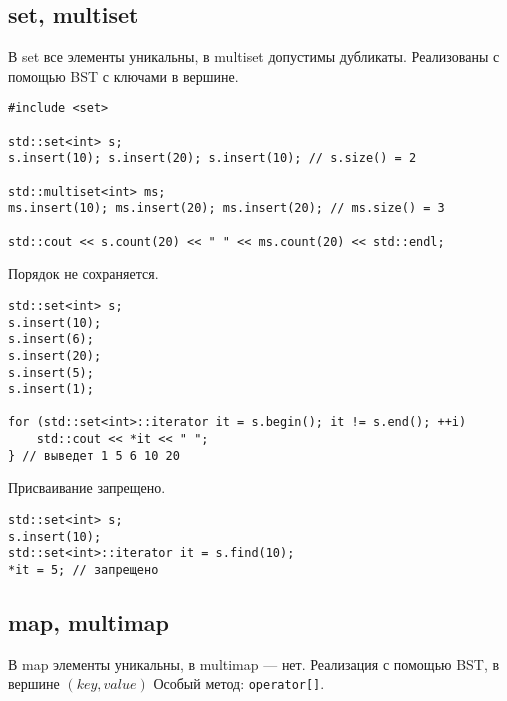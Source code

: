 \subsection{set, multiset}
В set все элементы уникальны, в multiset допустимы дубликаты. Реализованы с помощью BST с ключами в вершине. 
\begin{verbatim}
#include <set>

std::set<int> s;
s.insert(10); s.insert(20); s.insert(10); // s.size() = 2

std::multiset<int> ms;
ms.insert(10); ms.insert(20); ms.insert(20); // ms.size() = 3

std::cout << s.count(20) << " " << ms.count(20) << std::endl;
\end{verbatim}
Порядок не сохраняется. 
\begin{verbatim}
std::set<int> s;
s.insert(10);
s.insert(6);
s.insert(20);
s.insert(5);
s.insert(1);

for (std::set<int>::iterator it = s.begin(); it != s.end(); ++i) 
	std::cout << *it << " ";
} // выведет 1 5 6 10 20
\end{verbatim}
Присваивание запрещено.
\begin{verbatim}
std::set<int> s;
s.insert(10);
std::set<int>::iterator it = s.find(10);
*it = 5; // запрещено
\end{verbatim}
\subsection{map, multimap}
В map элементы уникальны, в multimap --- нет. Реализация с помощью BST, в вершине $(key, value)$
Особый метод: \texttt{operator[]}.
